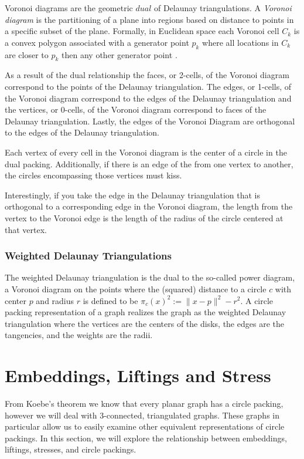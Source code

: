 \documentclass[11pt]{article}
\theoremstyle{definition}
\begin{document}
	Voronoi diagrams are the geometric $dual$ of Delaunay triangulations. 
	A \emph{Voronoi diagram} is the partitioning of a plane into regions based on distance to points in a specific subset of the plane. 
	Formally, in Euclidean space each Voronoi cell $C_k$ is a convex polygon associated with a generator point $p_k$ where all locations in $C_k$ are closer to $p_k$ then any other generator point \cite{voronoiDiagrams}. 

	As a result of the dual relationship the faces, or 2-cells, of the Voronoi diagram correspond to the points of the Delaunay triangulation. 
	The edges, or 1-cells, of the Voronoi diagram correspond to the edges of the Delaunay triangulation and the vertices, or 0-cells, of the Voronoi diagram correspond to faces of the Delaunay triangulation.
	Lastly, the edges of the Voronoi Diagram are orthogonal to the edges of the Delaunay triangulation. 

	Each vertex of every cell in the Voronoi diagram is the center of a circle in the dual packing. 
	Additionally, if there is an edge of the from one vertex to another, the circles encompassing those vertices must kiss. 
	
	Interestingly, if you take the edge in the Delaunay triangulation that is orthogonal to a corresponding edge in the Voronoi diagram, the length from the vertex to the Voronoi edge is the length of the radius of the circle centered at that vertex.

\subsubsection{Weighted Delaunay Triangulations}
	The weighted Delaunay triangulation is the dual to the so-called power diagram, a Voronoi diagram on the points where the (squared) distance to a circle $c$ with center $p$ and radius $r$ is defined to be $\pi_c(x)^2 := \|x-p\|^2 - r^2$.
  	A circle packing representation of a graph realizes the graph as the weighted Delaunay triangulation where the vertices are the centers of the disks, the edges are the tangencies, and the weights are the radii.
  
\section{Embeddings, Liftings and Stress}
	
	From Koebe's theorem we know that every planar graph has a circle packing, however we will deal with 3-connected, triangulated graphs. 
	These graphs in particular allow us to easily examine other equivalent representations of circle packings. 
	In this section, we will explore the relationship between embeddings, liftings, stresses, and circle packings.
\end{document}
